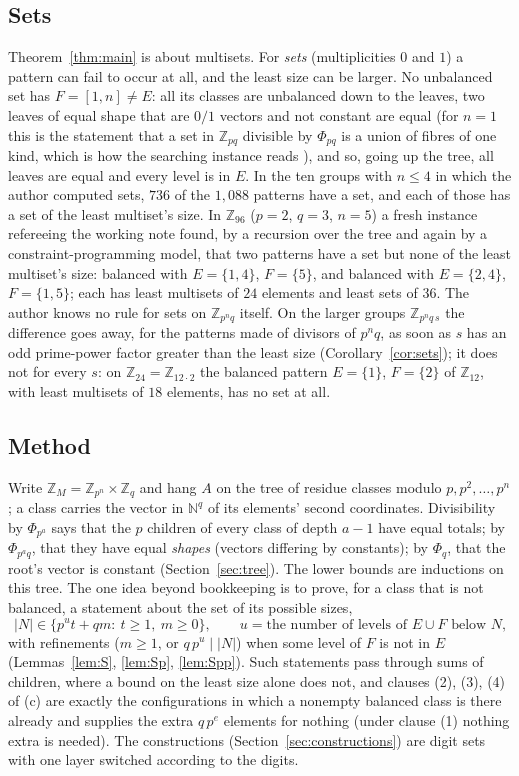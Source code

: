 \documentclass[11pt,a4paper]{amsart}
\theoremstyle{definition}
\theoremstyle{remark}
\newcommand{\Z}{\mathbb{Z}}
\newcommand{\N}{\mathbb{N}}
\begin{document}
\subsection{Sets}\label{sec:intro-sets} Theorem~\ref{thm:main} is about multisets. For \emph{sets} (multiplicities $0$ and $1$)
a pattern can fail to occur at all, and the least size can be larger. No unbalanced set has $F=[1,n]\ne E$:
all its classes are unbalanced down to the leaves, two leaves of equal shape that are $0/1$ vectors and not
constant are equal (for $n=1$ this is the statement that a set in $\Z_{pq}$ divisible by $\Phi_{pq}$ is a union of fibres
of one kind, which is how the searching instance reads \cite[Proposition~3.8(a)]{KMSV}), and so, going up the tree, all leaves are equal and every level is in $E$. In the ten
groups with $n\le4$ in which the author computed sets, $736$ of the $1{,}088$ patterns have a set, and each
of those has a set of the least multiset's size. In $\Z_{96}$ ($p=2$, $q=3$, $n=5$) a fresh instance
refereeing the working note found, by a recursion over the tree and again by a constraint-programming model, that two
patterns have a set but none of the least multiset's size: balanced with $E=\{1,4\}$, $F=\{5\}$, and balanced
with $E=\{2,4\}$, $F=\{1,5\}$; each has least multisets of $24$ elements and least sets of $36$. The author knows no rule for sets on $\Z_{p^nq}$ itself. On the larger groups $\Z_{p^nq\,s}$ the difference goes away, for the patterns made of divisors of $p^nq$, as soon as $s$ has an odd prime-power factor greater than the least size (Corollary~\ref{cor:sets}); it does not for every $s$: on $\Z_{24}=\Z_{12\cdot2}$ the balanced pattern $E=\{1\}$, $F=\{2\}$ of $\Z_{12}$, with least multisets of $18$ elements, has no set at all.

\subsection{Method} Write $\Z_M=\Z_{p^n}\times\Z_q$ and hang $A$ on the tree of residue classes modulo
$p,p^2,\dots,p^n$; a class carries the vector in $\N^q$ of its elements' second coordinates. Divisibility by
$\Phi_{p^a}$ says that the $p$ children of every class of depth $a-1$ have equal totals; by $\Phi_{p^aq}$,
that they have equal \emph{shapes} (vectors differing by constants); by $\Phi_q$, that the root's vector is
constant (Section~\ref{sec:tree}). The lower bounds are inductions on this tree. The one idea beyond
bookkeeping is to prove, for a class that is not balanced, a statement about the set of its possible sizes,
\[ |N|\in\{p^ut+qm:\ t\ge 1,\ m\ge 0\},\qquad u=\text{the number of levels of $E\cup F$ below $N$,}\]
with refinements ($m\ge 1$, or $q\,p^u\mid |N|$) when some level of $F$ is not in $E$
(Lemmas~\ref{lem:S}, \ref{lem:Sp}, \ref{lem:Spp}). Such statements pass through sums of children, where a
bound on the least size alone does not, and clauses (2), (3), (4) of (c) are exactly the configurations in which a nonempty balanced class is
there already and supplies the extra $q\,p^{e}$ elements for nothing (under clause (1) nothing extra is
needed). The constructions
(Section~\ref{sec:constructions}) are digit sets with one layer switched according to the digits.
\end{document}
